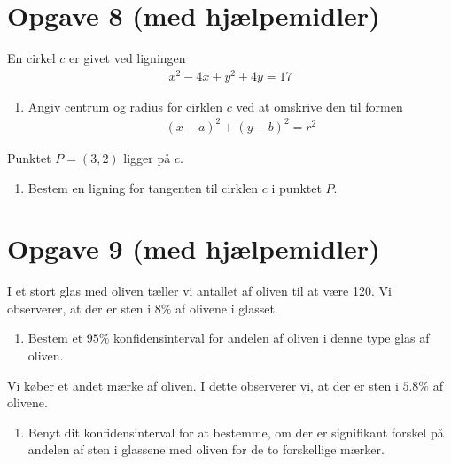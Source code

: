 \section*{Opgave 8 (med hjælpemidler)}
En cirkel $c$ er givet ved ligningen 
\begin{align*}
x^2-4x+y^2+4y = 17
\end{align*}
\begin{enumerate}[label=\roman*)]
\item Angiv centrum og radius for cirklen $c$ ved at omskrive den til formen
\begin{align*}
(x-a)^2+(y-b)^2 = r^2
\end{align*}
\end{enumerate}
Punktet $P = (3,2)$ ligger på $c$. 
\begin{enumerate}[label=\roman*)]
\item Bestem en ligning for tangenten til cirklen $c$ i punktet $P$.
\end{enumerate}

\section*{Opgave 9 (med hjælpemidler)}
I et stort glas med oliven tæller vi antallet af oliven til at være 120. Vi observerer, at der er sten i $8\%$ af olivene i glasset. 
\begin{enumerate}[label=\roman*)]
\item Bestem et $95\%$ konfidensinterval for andelen af oliven i denne type glas af oliven. 
\end{enumerate}
Vi køber et andet mærke af oliven. I dette observerer vi, at der er sten i $5.8\%$ af olivene. 
\begin{enumerate}[label=\roman*)]
\item Benyt dit konfidensinterval for at bestemme, om der er signifikant forskel på andelen af sten i glassene med oliven for de to forskellige mærker. 
\end{enumerate} 